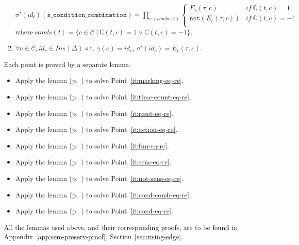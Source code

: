 \documentclass[dvipsnames,12pt]{article}
\begin{document}
\begin{niproof}
\begin{frameb}
\begin{enumerate}
      $\sigma'(id_t)(\texttt{s\_condition\_combination})=
      \prod\limits_{c\in{}conds(t)}
      \begin{cases}
        E_c(\tau,c) & if~\mathbb{C}(t,c)=1 \\
        \mathtt{not}(E_c(\tau,c)) & if~\mathbb{C}(t,c)=-1 \\
      \end{cases}$\\
      where
      $conds(t)=\{c\in\mathcal{C}~\vert~\mathbb{C}(t,c)=1\lor\mathbb{C}(t,c)=-1\}$.\label{it:cond-comb-eq-re}
    \item $\forall{}c\in\mathcal{C},id_c\in{}Ins(\Delta)$
      s.t. $\gamma(c)=id_c$,
      $\sigma'(id_c)=E_c(\tau,c)$.\label{it:cond-eq-re}
    \end{enumerate}
  \end{frameb}
  
  Each point is proved by a separate lemma:
  \begin{itemize}[label=--]
  \item Apply the  lemma
    (p.~\pageref{lem:re-equal-marking}) to solve
    Point~\ref{it:marking-eq-re}.
  \item Apply the  lemma
    (p.~\pageref{lem:re-equal-tc}) to solve
    Point~\ref{it:time-count-eq-re}.
  \item Apply the  lemma
    (p.~\pageref{lem:re-equal-reset-orders}) to solve
    Point~\ref{it:reset-eq-re}.
  \item Apply the  lemma
    (p.~\pageref{lem:re-equal-action-exec}) to solve
    Point~\ref{it:action-eq-re}.
  \item Apply the  lemma
    (p.~\pageref{lem:re-equal-fun-exec}) to solve
    Point~\ref{it:fun-eq-re}.
  \item Apply the  lemma
    (p.~\pageref{lem:re-equal-sens}) to solve
    Point~\ref{it:sens-eq-re}.
  \item Apply the  lemma
    (p.~\pageref{lem:re-equal-not-sens}) to solve
    Point~\ref{it:not-sens-eq-re}.
  \item Apply the  lemma
    (p.~\pageref{lem:re-equal-cond-comb}) to solve
    Point~\ref{it:cond-comb-eq-re}.
  \item Apply the  lemma
    (p.~\pageref{lem:re-equal-cond}) to solve
    Point~\ref{it:cond-eq-re}.
  \end{itemize}

  All the lemmas used above, and their corresponding proofs, are to be
  found in Appendix~\ref{app:sem-preserv-proof},
  Section~\ref{sec:rising-edge}.
\end{niproof}
\end{document}
